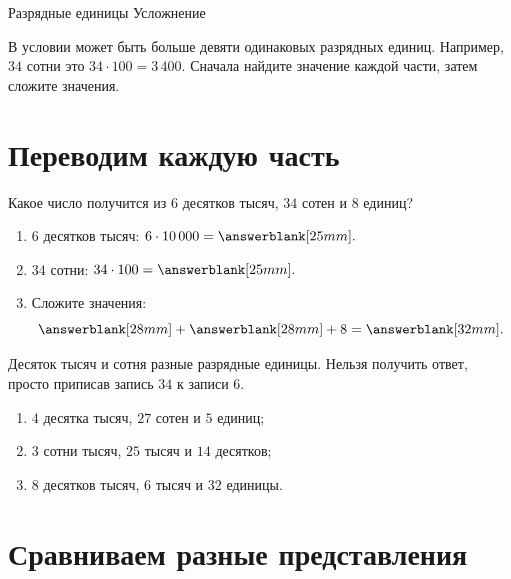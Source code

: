 \worksheettitle
  {Разрядные единицы}
  { Усложнение}

\studentnameblock

\begin{notebox}
  В условии может быть больше девяти одинаковых разрядных единиц. Например,
  \(34\) сотни \textemdash{} это \(34\cdot100=3\,400\). Сначала найдите значение каждой
  части, затем сложите значения.
\end{notebox}

\section{Переводим каждую часть}

\begin{problembox}
  Какое число получится из \(6\) десятков тысяч, \(34\) сотен и \(8\) единиц?
  \begin{enumerate}[label=\textbf{\arabic*.}]
    \item \(6\) десятков тысяч: \(6\cdot10\,000=\answerblank[25mm].\)
    \item \(34\) сотни: \(34\cdot100=\answerblank[25mm].\)
    \item Сложите значения:
      \[
        \answerblank[28mm]+\answerblank[28mm]+8=\answerblank[32mm].
      \]
  \end{enumerate}
\end{problembox}

\begin{warningbox}
  Десяток тысяч и сотня \textemdash{} разные разрядные единицы. Нельзя получить ответ,
  просто приписав запись \(34\) к записи \(6\).
\end{warningbox}

\begin{practicebox}
  \begin{enumerate}[label=\textbf{\arabic*.}]
    \item \(4\) десятка тысяч, \(27\) сотен и \(5\) единиц;
    \item \(3\) сотни тысяч, \(25\) тысяч и \(14\) десятков;
    \item \(8\) десятков тысяч, \(6\) тысяч и \(32\) единицы.
  \end{enumerate}
\end{practicebox}

\section{Сравниваем разные представления}

